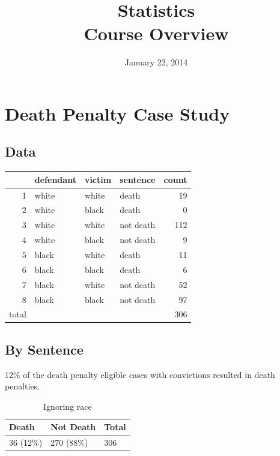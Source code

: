 \documentclass{exam}
\author{}
\date{January 22, 2014}
\title{Statistics \\ Course Overview}
\begin{document}
  \maketitle
  \section{Death Penalty Case Study}
  
  \subsection{Data}
  \begin{table}[ht]
  \centering
  \begin{tabular}{rlllr}
    \toprule
          & defendant & victim & sentence  & count \\
    \midrule
    1     & white & white & death     & 19 \\
    2     & white & black & death     & 0 \\
    3     & white & white & not death & 112 \\
    4     & white & black & not death & 9 \\
    5     & black & white & death     & 11 \\
    6     & black & black & death     & 6 \\
    7     & black & white & not death & 52 \\
    8     & black & black & not death & 97 \\
    \midrule
    total &       &       &           & 306 \\
    \bottomrule
  \end{tabular}
  \end{table}

  \subsection{By Sentence}

  12\% of the death penalty eligible cases with convictions resulted in death penalties.

  \begin{table}[H]
    \centering
    \begin{tabular}{lll}
      \toprule
      Death     & Not Death  & Total \\
      \midrule
      36 (12\%) & 270 (88\%) & 306 \\
       \bottomrule
    \end{tabular}
    \caption{Ignoring race}
  \end{table}
\end{document}
